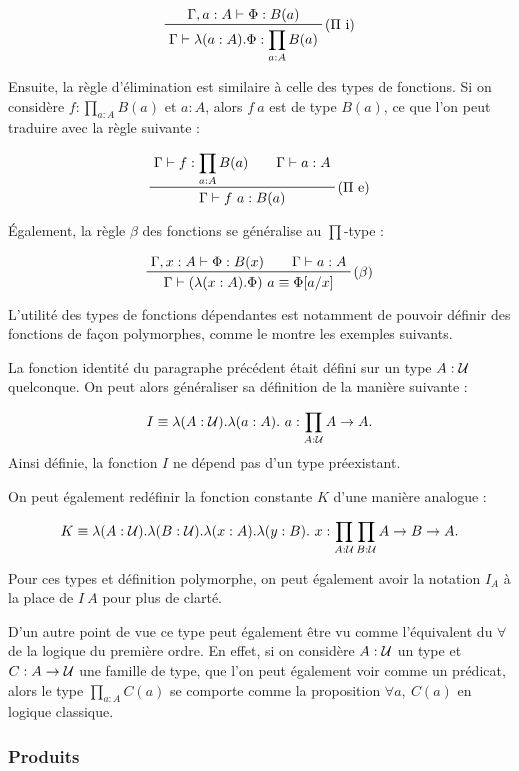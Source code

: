 \documentclass[../../rapport.tex]{subfiles}
\begin{document}
  $$
  \prftree[r]{($\Pi$ i)}{\Gamma, a : A \vdash \Phi : B(a)}
    {\Gamma \vdash \lambda(a : A). \Phi : \prod_{a:A}{B(a)}}
  $$

  Ensuite, la règle d'élimination est similaire à celle des types de fonctions.
  Si on considère $f : \prod_{a:A}B(a)$ et $a : A$, alors $f\ a$ est de type $B(a)$,
  ce que l'on peut traduire avec la règle suivante :

  $$
  \prfinterspace=2em
  \prftree[r]{($\Pi$ e)}{\Gamma \vdash f : \prod_{a:A}{B(a)}}{\Gamma \vdash a : A}
    {\Gamma \vdash f\ a : B(a)}
  $$

  Également, la règle $\beta$ des fonctions se généralise au $\prod$-type :

  $$
  \prfinterspace=2em
  \prftree[r]{($\beta$)}{\Gamma, x : A \vdash \Phi : B(x)}{\Gamma \vdash a : A}
    {\Gamma \vdash (\lambda(x : A).\Phi)\ a \equiv \Phi[a/x]}
  $$

  L'utilité des types de fonctions dépendantes est notamment de pouvoir définir des fonctions de façon polymorphes,
  comme le montre les exemples suivants.

  \begin{example}
    La fonction identité du paragraphe précédent était défini sur un type $A : \mathcal U$ quelconque.
    On peut alors généraliser sa définition de la manière suivante :

    $$I \equiv \lambda (A : \mathcal U). \lambda (a : A).\ a : \prod_{A : \mathcal U}{A \rightarrow A}.$$
    Ainsi définie, la fonction $I$ ne dépend pas d'un type préexistant.

    On peut également redéfinir la fonction constante $K$ d'une manière analogue :

    $$K \equiv \lambda (A : \mathcal U). \lambda (B : \mathcal U). \lambda (x : A). \lambda (y : B).\ x :
      \prod_{A : \mathcal U}\prod_{B : \mathcal U}{A \rightarrow B \rightarrow A}.$$

    Pour ces types et définition polymorphe, on peut également avoir la notation $I_A$ à la place de $I\ A$
    pour plus de clarté.
  \end{example}

  D'un autre point de vue ce type peut également être vu comme l'équivalent du $\forall$ de la logique
  du première ordre.
  En effet, si on considère $A : \mathcal U$ un type et $C : A \rightarrow \mathcal U$ une famille de type,
  que l'on peut également voir comme un prédicat, alors le type $\prod_{a : A}{C(a)}$ se comporte comme
  la proposition $\forall a,\ C(a)$ en logique classique.

  \subsubsection{Produits}
\end{document}
